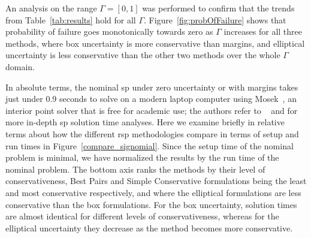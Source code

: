 An analysis on the range $\Gamma=[0,1]$ was performed to confirm that the trends from
Table~\ref{tab:results} hold for all $\Gamma$. Figure~\ref{fig:probOfFailure}
shows that probability of failure goes monotonically
towards zero as $\Gamma$ increases for all three methods, where box uncertainty is
more conservative than margins, and elliptical uncertainty is less conservative
than the other two methods over the whole $\Gamma$ domain.

In absolute
terms, the nominal \gls{sp} under zero uncertainty or with margins
takes just under 0.9 seconds to solve on a modern laptop computer using Mosek~\cite{mosek},
an interior point solver that is free for academic use; the authors
refer to ~\cite{Kirschen2018Log} and \cite{York2018} for more in-depth \gls{sp} solution time analyses.
Here we examine briefly in relative terms about how the different \gls{rsp} methodologies compare in terms of setup and
run times in Figure~\ref{compare_signomial}. Since the setup time of the nominal problem is minimal,
we have normalized the results by the run time of the nominal problem.
The bottom axis ranks the methods by their level of conservativeness, Best Pairs
and Simple Conservative formulations being the least and most conservative respectively,
and where the elliptical formulations are less conservative than the box formulations.
For the box uncertainty, solution times are almost identical for different levels of conservativeness,
whereas for the elliptical uncertainty they decrease as the method becomes more conservative.

